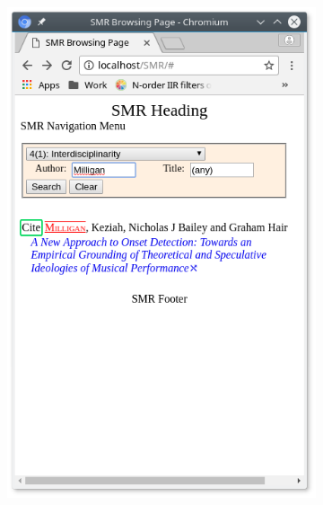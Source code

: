 \documentclass[a4paper,10pt]{SMR}
\begin{document}
\begin{figure}
 \begin{subfigure}[t]{0.45\textwidth}
  \includegraphics[width=\textwidth]{SMR_page-search.png}
  \label{sf:specificvol}
 \end{subfigure}
 \begin{subfigure}[t]{0.45\textwidth}

\end{subfigure}
\end{figure}
\end{document}

